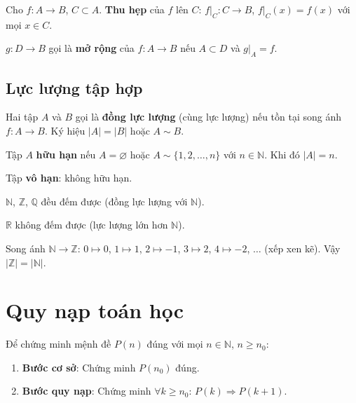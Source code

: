 \documentclass[12pt,a4paper]{article}
\begin{document}
\begin{dinhnghia}
  Cho $f: A \to B$, $C \subset A$. \textbf{Thu hẹp} của $f$ lên $C$: $f|_C: C \to B$, $f|_C(x) = f(x)$ với mọi $x \in C$.
\end{dinhnghia}

\begin{dinhnghia}
  $g: D \to B$ gọi là \textbf{mở rộng} của $f: A \to B$ nếu $A \subset D$ và $g|_A = f$.
\end{dinhnghia}

\subsection{Lực lượng tập hợp}

\begin{dinhnghia}
  Hai tập $A$ và $B$ gọi là \textbf{đồng lực lượng} (cùng lực lượng) nếu tồn tại song ánh $f: A \to B$. Ký hiệu $|A| = |B|$ hoặc $A \sim B$.
\end{dinhnghia}

\begin{dinhnghia}
  Tập $A$ \textbf{hữu hạn} nếu $A = \varnothing$ hoặc $A \sim \{1, 2, \ldots, n\}$ với $n \in \mathbb{N}$. Khi đó $|A| = n$. 
  
  Tập \textbf{vô hạn}: không hữu hạn.
\end{dinhnghia}

\begin{dinhly}
  $\mathbb{N}$, $\mathbb{Z}$, $\mathbb{Q}$ đều đếm được (đồng lực lượng với $\mathbb{N}$). 
  
  $\mathbb{R}$ không đếm được (lực lượng lớn hơn $\mathbb{N}$).
\end{dinhly}

\begin{vidu}
  Song ánh $\mathbb{N} \to \mathbb{Z}$: $0 \mapsto 0$, $1 \mapsto 1$, $2 \mapsto -1$, $3 \mapsto 2$, $4 \mapsto -2$, $\ldots$ (xếp xen kẽ). Vậy $|\mathbb{Z}| = |\mathbb{N}|$.
\end{vidu}

\section{Quy nạp toán học}

\begin{phuongphap}[title={Nguyên lý quy nạp}]
  Để chứng minh mệnh đề $P(n)$ đúng với mọi $n \in \mathbb{N}$, $n \ge n_0$:
  \begin{enumerate}
    \item \textbf{Bước cơ sở}: Chứng minh $P(n_0)$ đúng.
    \item \textbf{Bước quy nạp}: Chứng minh $\forall k \ge n_0$: $P(k) \Rightarrow P(k+1)$.
  \end{enumerate}
\end{phuongphap}
\end{document}
